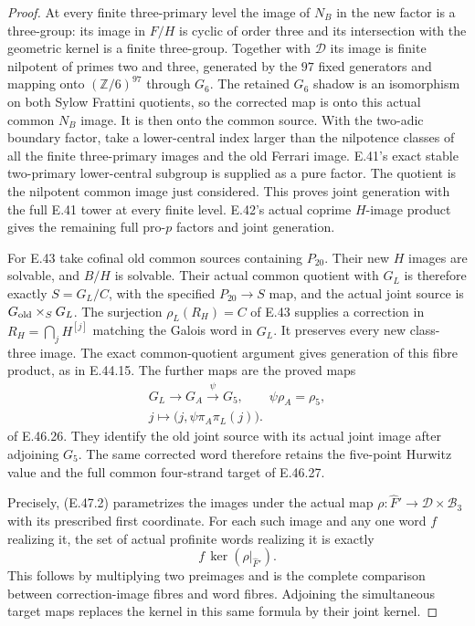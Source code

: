 \begin{proof}
At every finite three-primary level the image
of $N_B$ in the new factor is a three-group:
its image in $F/H$ is cyclic of order three
and its intersection with the geometric
kernel is a finite three-group.  Together
with $\mathscr D$ its image is finite nilpotent
of primes two and three, generated by the
$97$ fixed generators and mapping onto
$(\mathbb Z/6)^{97}$ through $G_6$.
The retained $G_6$ shadow is an isomorphism
on both Sylow Frattini quotients, so the
corrected map is onto this actual common
$N_B$ image.  It is then onto the common
source.  With the two-adic boundary factor,
take a lower-central index larger than the
nilpotence classes of all the finite
three-primary images and the old Ferrari
image.  E.41's exact stable two-primary
lower-central subgroup is supplied as a
pure factor.  The quotient is the nilpotent
common image just considered.  This proves
joint generation with the full E.41 tower
at every finite level.  E.42's actual
coprime $H$-image product gives the remaining
full pro-$p$ factors and joint generation.

For E.43 take cofinal old common sources
containing $P_{20}$.  Their new $H$ images
are solvable, and $B/H$ is solvable.  Their
actual common quotient with $G_L$ is therefore
exactly $S=G_L/C$, with the specified
$P_{20}\to S$ map, and the actual joint
source is $G_{\rm old}\times_SG_L$.
The surjection $\rho_L(R_H)=C$ of E.43
supplies a correction in
$R_H=\bigcap_jH^{[j]}$ matching the Galois
word in $G_L$.  It preserves every new
class-three image.  The exact common-quotient
argument gives generation of this fibre
product, as in E.44.15.
The further maps are the proved maps
\[
 \begin{gathered}
 G_L\longrightarrow G_A\xrightarrow{\psi}G_5,
 \qquad \psi\rho_A=\rho_5,
 \\
 j\longmapsto\bigl(j,\psi\pi_A\pi_L(j)\bigr).
 \end{gathered}
 \tag{E.47.25}
\]
of E.46.26.  They identify the old joint
source with its actual joint image after
adjoining $G_5$.  The same corrected word
therefore retains the five-point Hurwitz
value and the full common four-strand
target of E.46.27.

Precisely, \textup{(E.47.2)} parametrizes the
images under the actual map
$\rho:\widehat F'\to\mathscr D\times\mathcal B_3$
with its prescribed first coordinate.
For each such image and any one word $f$
realizing it, the set of actual profinite
words realizing it is exactly
\[
                    f\,\ker(\rho|_{\widehat F'}).
 \tag{E.47.26}
\]
This follows by multiplying two preimages
and is the complete comparison between
correction-image fibres and word fibres.
Adjoining the simultaneous target maps
replaces the kernel in this same formula
by their joint kernel.


\end{proof}
